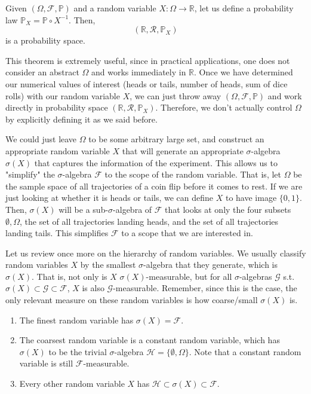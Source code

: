   \begin{theorem}
    Given $(\Omega, \mathcal{F}, \mathbb{P})$ and a random variable $X: \Omega \rightarrow \mathbb{R}$, let us define a probability law $\mathbb{P}_X = \mathbb{P} \circ X^{-1}$. Then, 
    \begin{equation}
      (\mathbb{R}, \mathcal{R}, \mathbb{P}_X)
    \end{equation}
    is a probability space. 
  \end{theorem}

  This theorem is extremely useful, since in practical applications, one does not consider an abstract $\Omega$ and works immediately in $\mathbb{R}$. Once we have determined our numerical values of interest (heads or tails, number of heads, sum of dice rolls) with our random variable $X$, we can just throw away $(\Omega, \mathcal{F}, \mathbb{P})$ and work directly in probability space $(\mathbb{R}, \mathcal{R}, \mathbb{P}_X)$. Therefore, we don't actually control $\Omega$ by explicitly defining it as we said before. 

  We could just leave $\Omega$ to be some arbitrary large set, and construct an appropriate random variable $X$ that will generate an appropriate $\sigma$-algebra $\sigma(X)$ that captures the information of the experiment. This allows us to "simplify" the $\sigma$-algebra $\mathcal{F}$ to the scope of the random variable. That is, let $\Omega$ be the sample space of all trajectories of a coin flip before it comes to rest. If we are just looking at whether it is heads or tails, we can define $X$ to have image $\{0, 1\}$. Then, $\sigma(X)$ will be a sub-$\sigma$-algebra of $\mathcal{F}$ that looks at only the four subsets $\emptyset, \Omega$, the set of all trajectories landing heads, and the set of all trajectories landing tails. This simplifies $\mathcal{F}$ to a scope that we are interested in. 

  Let us review once more on the hierarchy of random variables. We usually classify random variables $X$ by the smallest $\sigma$-algebra that they generate, which is $\sigma(X)$. That is, not only is $X$ $\sigma(X)$-measurable, but for all $\sigma$-algebras $\mathcal{G}$ s.t. $\sigma(X) \subset \mathcal{G} \subset \mathcal{F}$, $X$ is also $\mathcal{G}$-measurable. Remember, since this is the case, the only relevant measure on these random variables is how coarse/small $\sigma(X)$ is. 
  \begin{enumerate}
    \item The finest random variable has $\sigma(X) = \mathcal{F}$. 
    
    \item The coarsest random variable is a constant random variable, which has $\sigma(X)$ to be the trivial $\sigma$-algebra $\mathcal{H} = \{\emptyset, \Omega\}$. Note that a constant random variable is still $\mathcal{F}$-measurable. 
    
    \item Every other random variable $X$ has $\mathcal{H} \subset \sigma(X) \subset \mathcal{F}$. 
  \end{enumerate}

